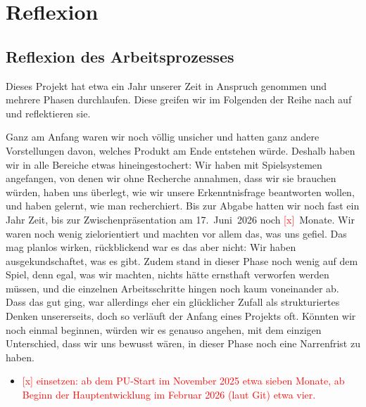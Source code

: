 \documentclass[../Main.tex]{subfiles}
\begin{document}
\section{Reflexion} \label{sec:Reflexion}

\subsection{Reflexion des Arbeitsprozesses}

Dieses Projekt hat etwa ein Jahr unserer Zeit in Anspruch genommen und mehrere Phasen durchlaufen. Diese greifen wir im Folgenden der Reihe nach auf und reflektieren sie.

Ganz am Anfang waren wir noch völlig unsicher und hatten ganz andere Vorstellungen davon, welches Produkt am Ende entstehen würde. Deshalb haben wir in alle Bereiche etwas hineingestochert: Wir haben mit Spielsystemen angefangen, von denen wir ohne Recherche annahmen, dass wir sie brauchen würden, haben uns überlegt, wie wir unsere Erkenntnisfrage beantworten wollen, und haben gelernt, wie man recherchiert. Bis zur Abgabe hatten wir noch fast ein Jahr Zeit, bis zur Zwischenpräsentation am 17.~Juni~2026 noch \textcolor{red}{[x]}~Monate. Wir waren noch wenig zielorientiert und machten vor allem das, was uns gefiel. Das mag planlos wirken, rückblickend war es das aber nicht: Wir haben ausgekundschaftet, was es gibt. Zudem stand in dieser Phase noch wenig auf dem Spiel, denn egal, was wir machten, nichts hätte ernsthaft verworfen werden müssen, und die einzelnen Arbeitsschritte hingen noch kaum voneinander ab. Dass das gut ging, war allerdings eher ein glücklicher Zufall als strukturiertes Denken unsererseits, doch so verläuft der Anfang eines Projekts oft. Könnten wir noch einmal beginnen, würden wir es genauso angehen, mit dem einzigen Unterschied, dass wir uns bewusst wären, in dieser Phase noch eine Narrenfrist zu haben.

\begin{itemize}[leftmargin=1.5cm]
    \item \textcolor{red}{[x] einsetzen: ab dem PU-Start im November 2025 etwa sieben Monate, ab Beginn der Hauptentwicklung im Februar 2026 (laut Git) etwa vier.}
\end{itemize}
\end{document}
